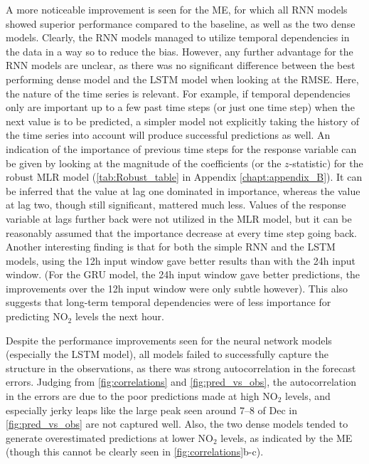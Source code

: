 A more noticeable improvement is seen for the ME, for which all RNN models showed superior performance compared to the baseline, as well as the two dense models. Clearly, the RNN models managed to utilize temporal dependencies in the data in a way so to reduce the bias. However, any further advantage for the RNN models are unclear, as there was no significant difference between the best performing dense model and the LSTM model when looking at the RMSE. Here, the nature of the time series is relevant. For example, if temporal dependencies only are important up to a few past time steps (or just one time step) when the next value is to be predicted, a simpler model not explicitly taking the history of the time series into account will produce successful predictions as well. An indication of the importance of previous time steps for the response variable can be given by looking at the magnitude of the coefficients (or the $z$-statistic) for the robust MLR model (\cref{tab:Robust_table} in Appendix \ref{chapt:appendix_B}). It can be inferred that the value at lag one dominated in importance, whereas the value at lag two, though still significant, mattered much less. Values of the response variable at lags further back were not utilized in the  MLR model, but it can be reasonably assumed that the importance decrease at every time step going back. Another interesting finding is that for both the simple RNN and the LSTM models, using the 12h input window gave better results than with the 24h input window. (For the GRU model, the 24h input window gave better predictions, the improvements over the 12h input window were only subtle however). This also suggests that long-term temporal dependencies were of less importance for predicting NO$_2$ levels the next hour. 

Despite the performance improvements seen for the neural network models (especially the LSTM model), all models failed to successfully capture the structure in the observations, as there was strong autocorrelation in the forecast errors. Judging from \cref{fig:correlations} and \cref{fig:pred_vs_obs}, the autocorrelation in the errors are due to the poor predictions made at high NO$_2$ levels, and especially jerky leaps like the large peak seen around 7--8 of Dec in \cref{fig:pred_vs_obs} are not captured well. Also, the two dense models tended to generate overestimated predictions at lower NO$_2$ levels, as indicated by the ME (though this cannot be clearly seen in \cref{fig:correlations}b-c).


